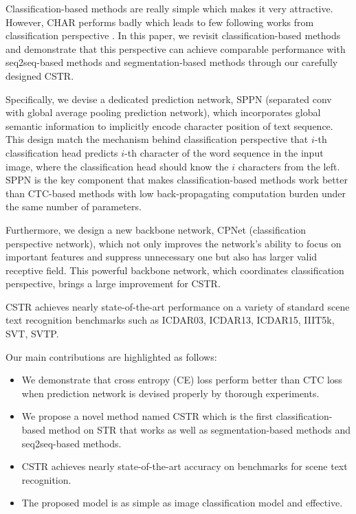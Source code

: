 \documentclass[final]{cvpr}
\begin{document}
Classification-based methods \cite{jaderberg14c} are really simple which makes it very attractive. However, CHAR performs badly which leads to few following works from classification perspective \cite{borisyuk2018rosetta}. In this paper, we revisit classification-based methods and demonstrate that this perspective can achieve comparable performance with seq2seq-based methods and segmentation-based methods through our carefully designed CSTR.

Specifically, we devise a dedicated prediction network, SPPN (separated conv with global average pooling prediction network), which incorporates global semantic information to implicitly encode character position of text sequence. This design match the mechanism behind classification perspective that $i$-th classification head predicts $i$-th character of the word sequence in the input image, where the classification head should know the $i$ characters from the left. SPPN is the key component that makes classification-based methods work better than CTC-based methods with low back-propagating computation burden under the same number of parameters.

Furthermore, we design a new backbone network, CPNet (classification perspective network), which not only improves the network's ability to focus on important features and suppress unnecessary one but also has larger valid receptive field. This powerful backbone network, which coordinates classification perspective, brings a large improvement for CSTR.

CSTR achieves nearly state-of-the-art performance on a variety of standard scene text recognition benchmarks such as ICDAR03, ICDAR13, ICDAR15, IIIT5k, SVT, SVTP.

Our main contributions are highlighted as follows:
\begin{itemize}

\item We demonstrate that cross entropy (CE) loss perform better than CTC loss when prediction network is devised properly by thorough experiments.

\item We propose a novel method named CSTR which is the first classification-based method on STR that works as well as segmentation-based methods and seq2seq-based methods.

\item CSTR achieves nearly state-of-the-art accuracy on benchmarks for scene text recognition.

\item The proposed model is as simple as image classification model and effective.
\end{itemize}
\end{document}
